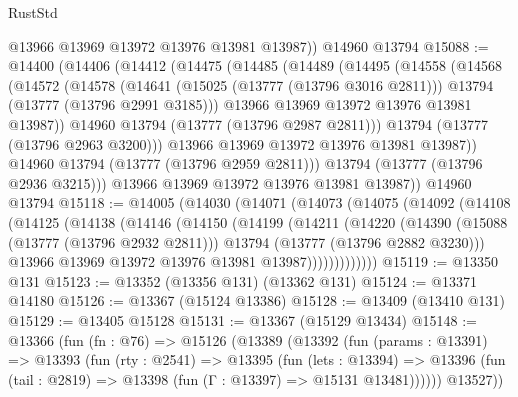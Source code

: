 \begin{lexlean}{RustStd}
\begin{coremodule}
        @13966
        @13969
        @13972
        @13976
        @13981
        @13987))
    @14960
    @13794
@15088 := @14400
    (@14406
      (@14412
        (@14475
          (@14485
            (@14489
              (@14495
                (@14558
                  (@14568
                    (@14572
                      (@14578
                        (@14641
                          (@15025 (@13777 (@13796 @3016 @2811)))
                          @13794
                          (@13777 (@13796 @2991 @3185)))
                        @13966
                        @13969
                        @13972
                        @13976
                        @13981
                        @13987))
                    @14960
                    @13794
                    (@13777 (@13796 @2987 @2811)))
                  @13794
                  (@13777 (@13796 @2963 @3200)))
                @13966
                @13969
                @13972
                @13976
                @13981
                @13987))
            @14960
            @13794
            (@13777 (@13796 @2959 @2811)))
          @13794
          (@13777 (@13796 @2936 @3215)))
        @13966
        @13969
        @13972
        @13976
        @13981
        @13987))
    @14960
    @13794
@15118 := @14005
    (@14030
      (@14071
        (@14073
          (@14075
            (@14092
              (@14108
                (@14125
                  (@14138
                    (@14146
                      (@14150
                        (@14199
                          (@14211
                            (@14220
                              (@14390
                                (@15088 (@13777 (@13796 @2932 @2811)))
                                @13794
                                (@13777 (@13796 @2882 @3230)))
                              @13966
                              @13969
                              @13972
                              @13976
                              @13981
                              @13987)))))))))))))
@15119 := @13350 @131
@15123 := @13352 (@13356 @131) (@13362 @131)
@15124 := @13371 @14180
@15126 := @13367 (@15124 @13386)
@15128 := @13409 (@13410 @131)
@15129 := @13405 @15128
@15131 := @13367 (@15129 @13434)
@15148 := @13366
    (fun (fn : @76) =>
    @15126
      (@13389
        (@13392
          (fun (params : @13391) =>
          @13393
            (fun (rty : @2541) =>
            @13395
              (fun (lets : @13394) =>
              @13396 (fun (tail : @2819) => @13398 (fun (Γ : @13397) => @15131 @13481))))))
        @13527))

\end{coremodule}
\end{lexlean}
